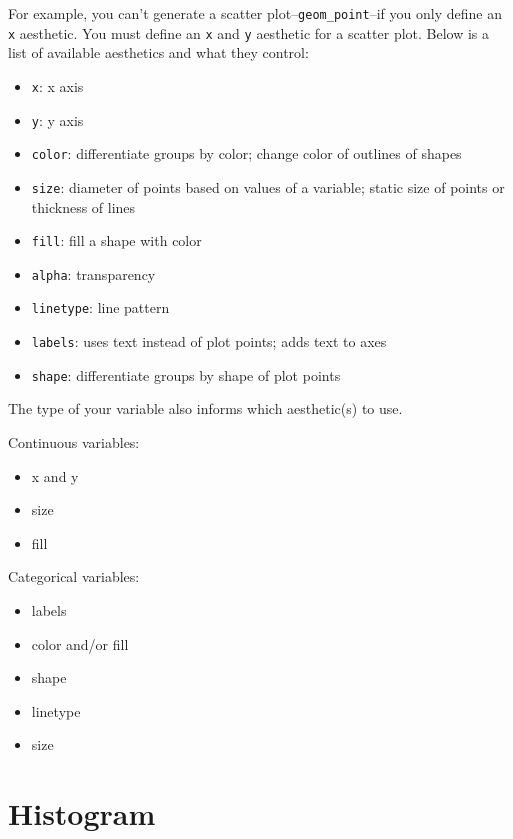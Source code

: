 \documentclass[
]{book}
\providecommand{\tightlist}{%
  \setlength{\itemsep}{0pt}\setlength{\parskip}{0pt}}
\begin{document}
For example, you can't generate a scatter plot--\texttt{geom\_point}--if you only define an \texttt{x} aesthetic. You must define an \texttt{x} and \texttt{y} aesthetic for a scatter plot. Below is a list of available aesthetics and what they control:

\begin{itemize}
\tightlist
\item
  \texttt{x}: x axis
\item
  \texttt{y}: y axis
\item
  \texttt{color}: differentiate groups by color; change color of outlines of shapes
\item
  \texttt{size}: diameter of points based on values of a variable; static size of points or thickness of lines
\item
  \texttt{fill}: fill a shape with color
\item
  \texttt{alpha}: transparency
\item
  \texttt{linetype}: line pattern
\item
  \texttt{labels}: uses text instead of plot points; adds text to axes
\item
  \texttt{shape}: differentiate groups by shape of plot points
\end{itemize}

The type of your variable also informs which aesthetic(s) to use.

Continuous variables:

\begin{itemize}
\tightlist
\item
  x and y
\item
  size
\item
  fill
\end{itemize}

Categorical variables:

\begin{itemize}
\tightlist
\item
  labels
\item
  color and/or fill
\item
  shape
\item
  linetype
\item
  size
\end{itemize}

\hypertarget{histogram-1}{%
\section{Histogram}\label{histogram-1}}
\end{document}
